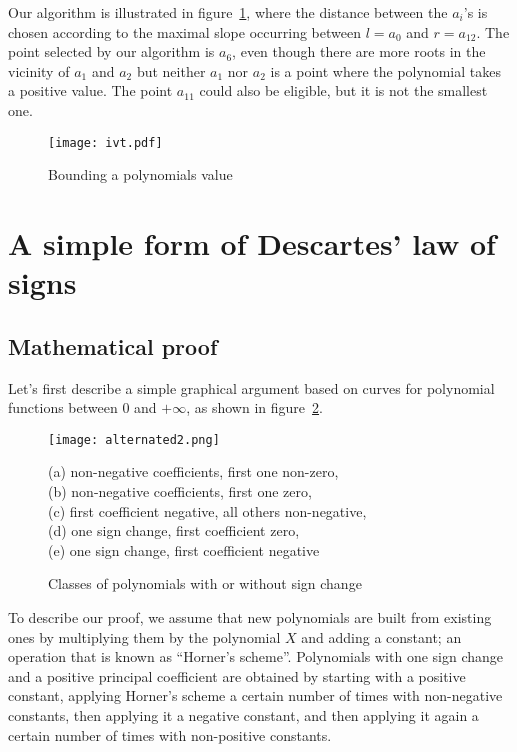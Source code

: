 \documentclass{mscs}
\begin{document}
Our algorithm is illustrated in figure~\ref{ivt}, where the distance
between the \(a_i\)'s is chosen according to the maximal slope
occurring between \(l=a_0\) and \(r=a_{12}\). The point selected by
our algorithm is \(a_6\), even though there are more roots in the
vicinity of \(a_1\) and \(a_2\) but neither \(a_1\) nor \(a_2\) is a
point where the polynomial takes a positive value.  The point \(a_{11}\) could
also be eligible, but it is not the smallest one.
\begin{figure}
\label{ivt}
\begin{center}
\texttt{[image: ivt.pdf]}
\end{center}
\caption{Bounding a polynomials value}
\end{figure}

\section{A simple form of Descartes' law of signs}
\subsection{Mathematical proof}
Let's first describe a simple graphical argument based on curves for polynomial functions between 0 and \(+\infty\), as shown in figure~\ref{graph-desc}.
\begin{figure}
\label{graph-desc}
\begin{center}
\texttt{[image: alternated2.png]}
\end{center}
{(a) non-negative coefficients, first one non-zero,\\
(b) non-negative coefficients, first one zero,\\
(c) first coefficient negative, all others non-negative,\\
(d) one sign change, first coefficient zero,\\
(e) one sign change, first coefficient negative}

\caption{Classes of polynomials with or without
sign change}
\end{figure}
To describe our proof, we assume that new polynomials are built from
existing ones by multiplying them by the polynomial \(X\) and adding a
constant; an operation that is known as ``Horner's scheme''.
Polynomials with one sign change and a positive principal coefficient
are obtained by starting with a positive constant, applying Horner's
scheme a certain number of times with non-negative constants, then
applying it a negative constant, and then applying it again a certain
number of times with non-positive constants.
\end{document}
